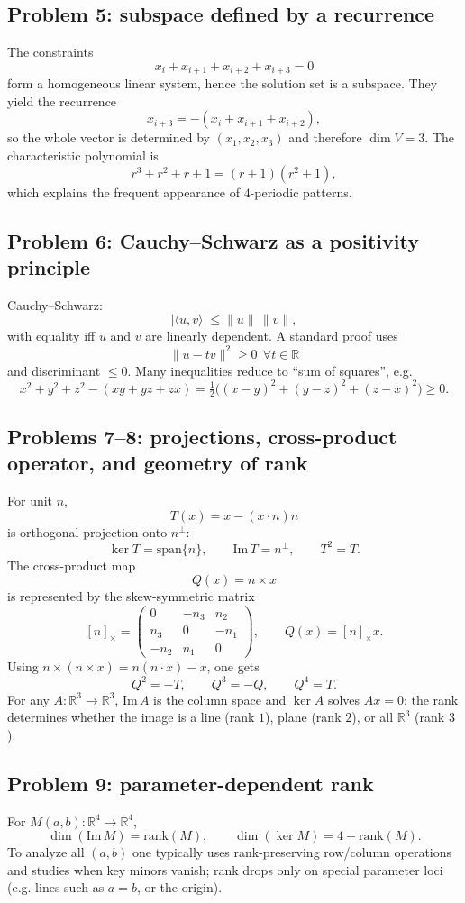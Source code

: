\documentclass[12pt,a4paper]{article}
\theoremstyle{plain}
\theoremstyle{definition}      %
\begin{document}
\subsection*{Problem 5: subspace defined by a recurrence}
The constraints
\[
x_i+x_{i+1}+x_{i+2}+x_{i+3}=0
\]
form a homogeneous linear system, hence the solution set is a subspace.
They yield the recurrence
\[
x_{i+3}=-(x_i+x_{i+1}+x_{i+2}),
\]
so the whole vector is determined by $(x_1,x_2,x_3)$ and therefore $\dim V=3$.
The characteristic polynomial is
\[
r^3+r^2+r+1=(r+1)(r^2+1),
\]
which explains the frequent appearance of $4$-periodic patterns.

\subsection*{Problem 6: Cauchy--Schwarz as a positivity principle}
Cauchy--Schwarz:
\[
|\langle u,v\rangle|\le \|u\|\,\|v\|,
\]
with equality iff $u$ and $v$ are linearly dependent.
A standard proof uses
\[
\|u-tv\|^2\ge 0\ \ \forall t\in\mathbb R
\]
and discriminant $\le 0$.
Many inequalities reduce to ``sum of squares'', e.g.
\[
x^2+y^2+z^2-(xy+yz+zx)=\tfrac12\big((x-y)^2+(y-z)^2+(z-x)^2\big)\ge 0.
\]

\subsection*{Problems 7--8: projections, cross-product operator, and geometry of rank}
For unit $n$,
\[
T(x)=x-(x\cdot n)n
\]
is orthogonal projection onto $n^\perp$:
\[
\ker T=\mathrm{span}\{n\},\qquad \mathrm{Im}\,T=n^\perp,\qquad T^2=T.
\]
The cross-product map
\[
Q(x)=n\times x
\]
is represented by the skew-symmetric matrix
\[
[n]_\times=\begin{pmatrix}
	0&-n_3&n_2\\
	n_3&0&-n_1\\
	-n_2&n_1&0
\end{pmatrix},
\qquad Q(x)=[n]_\times x.
\]
Using $n\times(n\times x)=n(n\cdot x)-x$, one gets
\[
Q^2=-T,\qquad Q^3=-Q,\qquad Q^4=T.
\]
For any $A:\mathbb R^3\to\mathbb R^3$, $\mathrm{Im}\,A$ is the column space and $\ker A$ solves $Ax=0$; the rank determines whether the image is a line (rank $1$), plane (rank $2$), or all $\mathbb R^3$ (rank $3$).

\subsection*{Problem 9: parameter-dependent rank}
For $M(a,b):\mathbb R^4\to\mathbb R^4$,
\[
\dim(\mathrm{Im}\,M)=\mathrm{rank}(M),\qquad \dim(\ker M)=4-\mathrm{rank}(M).
\]
To analyze all $(a,b)$ one typically uses rank-preserving row/column operations and studies when key minors vanish; rank drops only on special parameter loci (e.g. lines such as $a=b$, or the origin).
\end{document}
